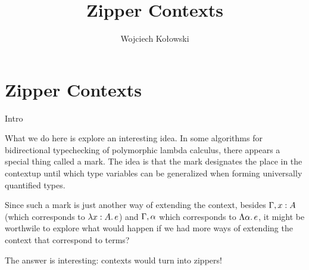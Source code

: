 \documentclass{beamer}
\title{Zipper Contexts}
\author{Wojciech Kołowski}
\date{}
\begin{document}
\frame{\titlepage}

\section{Zipper Contexts}

\begin{frame}{Intro}

What we do here is explore an interesting idea. In some algorithms for bidirectional typechecking of polymorphic lambda calculus, there appears a special thing called a mark. The idea is that the mark designates the place in the contextup until which type variables can be generalized when forming universally quantified types.

\vspace{2em}

Since such a mark is just another way of extending the context, besides $\Gamma, x : A$ (which corresponds to $\lambda x : A.\, e$) and $\Gamma, \alpha$ which corresponds to $\Lambda \alpha.\, e$, it might be worthwile to explore what would happen if we had more ways of extending the context that correspond to terms?

\vspace{2em}

The answer is interesting: contexts would turn into zippers!

\end{frame}

\newcommand{\ctxmark}{\circ}
\newcommand{\extendfun}[3]{#1, \fun{#2}{\ctxmark}, #2 : #3}
\newcommand{\extendfundef}[4]{#1, \fun{#2}{\ctxmark}, #2 : #3 := #4}
\newcommand{\extendappl}[2]{#1, \app{\ctxmark}{#2}}
\newcommand{\extendappr}[2]{#1, \app{#2}{\ctxmark}}
\newcommand{\extendpairl}[2]{#1, \pair{\ctxmark}{#2}}
\newcommand{\extendpairr}[2]{#1, \pair{#2}{\ctxmark}}
\newcommand{\extendoutl}[1]{#1, \outl{\ctxmark}}
\newcommand{\extendoutr}[1]{#1, \outr{\ctxmark}}
\newcommand{\extendinl}[1]{#1, \inl{\ctxmark}}
\newcommand{\extendinr}[1]{#1, \inr{\ctxmark}}
\newcommand{\extendcasearg}[3]{#1, \case{\ctxmark}{#2}{#3}}
\newcommand{\extendcasel}[5]{#1, \case{#2}{#3.\, \ctxmark}{#5}, #3 : #4}
\newcommand{\extendcaseldef}[6]{#1, \case{#2}{#4.\, \ctxmark}{#3}, #4 : #5 := #6}
\newcommand{\extendcaser}[5]{#1, \case{#2}{#3}{#4.\, \ctxmark}, #4 : #5}
\newcommand{\extendcaserdef}[6]{#1, \case{#2}{#3}{#4.\, \ctxmark}, #4 : #5 := #6}
\newcommand{\extendexfalso}[1]{#1, \exfalso{\ctxmark}}
\end{document}
